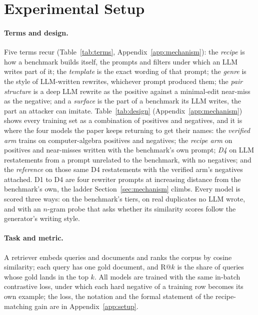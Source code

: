 \section{Experimental Setup}
\label{sec:setup}

\paragraph{Terms and design.}
Five terms recur (Table~\ref{tab:terms}, Appendix~\ref{app:mechanism}): the \emph{recipe} is how a benchmark builds itself, the prompts and filters under which an LLM writes part of it; the \emph{template} is the exact wording of that prompt; the \emph{genre} is the style of LLM-written rewrites, whichever prompt produced them; the \emph{pair structure} is a deep LLM rewrite as the positive against a minimal-edit near-miss as the negative; and a \emph{surface} is the part of a benchmark its LLM writes, the part an attacker can imitate. Table~\ref{tab:design} (Appendix~\ref{app:mechanism}) shows every training set as a combination of positives and negatives, and it is where the four models the paper keeps returning to get their names: the \emph{verified arm} trains on computer-algebra positives and negatives; the \emph{recipe arm} on positives and near-misses written with the benchmark's own prompt; \emph{D4} on LLM restatements from a prompt unrelated to the benchmark, with no negatives; and the \emph{reference} on those same D4 restatements with the verified arm's negatives attached. D1 to D4 are four rewriter prompts at increasing distance from the benchmark's own, the ladder Section~\ref{sec:mechanism} climbs. Every model is scored three ways: on the benchmark's tiers, on real duplicates no LLM wrote, and with an $n$-gram probe that asks whether its similarity scores follow the generator's writing style.

\paragraph{Task and metric.}
A retriever embeds queries and documents and ranks the corpus by cosine similarity; each query has one gold document, and R@$k$ is the share of queries whose gold lands in the top $k$. All models are trained with the same in-batch contrastive loss, under which each hard negative of a training row becomes its own example; the loss, the notation and the formal statement of the recipe-matching gain are in Appendix~\ref{app:setup}.

